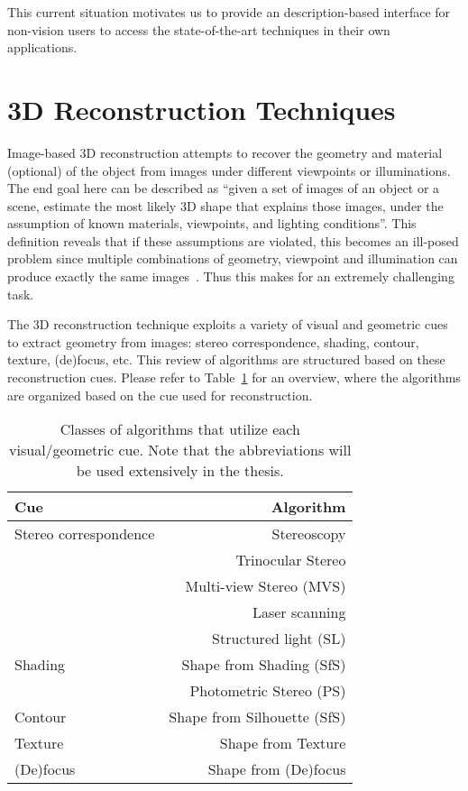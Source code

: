 This current situation motivates us to provide an description-based interface for non-vision users to access the state-of-the-art techniques in their own applications.

\section{3D Reconstruction Techniques}
\label{sec:3DRecon_Tech}
Image-based 3D reconstruction attempts to recover the geometry and material (optional) of the object from images under different viewpoints or illuminations. The end goal here can be described as ``given a set of images of an object or a scene, estimate the most likely 3D shape that explains those images, under the assumption of known materials, viewpoints, and lighting conditions''. This definition reveals that if these assumptions are violated, this becomes an ill-posed problem since multiple combinations of geometry, viewpoint and illumination can produce exactly the same images~\cite{poggio1985computational}. Thus this makes for an extremely challenging task.

The 3D reconstruction technique exploits a variety of visual and geometric cues to extract geometry from images: stereo correspondence, shading, contour, texture, (de)focus, etc. This review of algorithms are structured based on these reconstruction cues. Please refer to Table~\ref{tab:cue_algo} for an overview, where the algorithms are organized based on the cue used for reconstruction.
\begin{table}[h]
  \centering
  \begin{tabular}{l|r}
  \toprule
  \textbf{Cue} & \textbf{Algorithm}\\
  \midrule
  Stereo correspondence & Stereoscopy\\
  & Trinocular Stereo\\
  & Multi-view Stereo (MVS)\\
  & Laser scanning\\
  & Structured light (SL)\\
  \hline
  Shading & Shape from Shading (SfS)\\
  & Photometric Stereo (PS)\\
  \hline
  Contour & Shape from Silhouette (SfS)\\
  \hline
  Texture & Shape from Texture\\
  \hline
  (De)focus & Shape from (De)focus\\
  \bottomrule
  \end{tabular}
  \caption{Classes of algorithms that utilize each visual/geometric cue. Note that the abbreviations will be used extensively in the thesis.}
  \label{tab:cue_algo}
\end{table}

